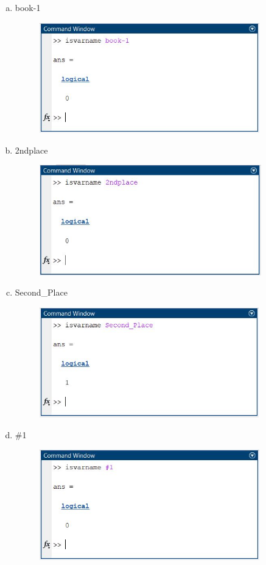 \documentclass{article}
\begin{document}
\begin{enumerate}[a)]
\begin{figure}[H]
        \end{figure}
    \item book-1
        \begin{figure}[H]
        \centering
        \includegraphics[height=4.8cm]{img6o.jpg}
        \end{figure}
    \item 2ndplace
        \begin{figure}[H]
        \centering
        \includegraphics[height=4.8cm]{img6p.jpg}
        \end{figure}
    \item Second\_Place
        \begin{figure}[H]
        \centering
        \includegraphics[height=4.8cm]{img6q.jpg}
        \end{figure}
    \item \#1
        \begin{figure}[H]
        \centering
        \includegraphics[height=4.8cm]{img6r.jpg}

\end{figure}
\end{enumerate}
\end{document}
